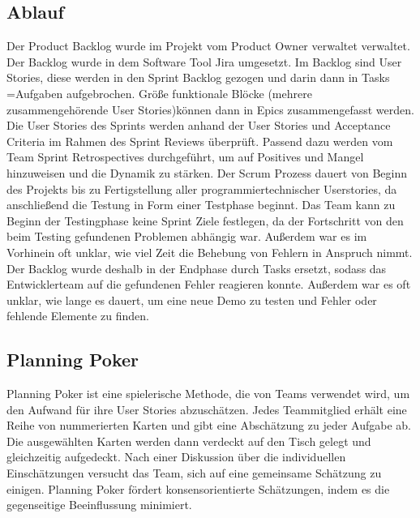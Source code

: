 \subsection{Ablauf}\label{subsec:Ablauf}
Der Product Backlog wurde im Projekt vom Product Owner verwaltet verwaltet.
Der Backlog wurde in dem Software Tool Jira umgesetzt.
Im Backlog sind User Stories, diese werden in den Sprint Backlog gezogen und darin dann in Tasks =Aufgaben aufgebrochen.
Größe funktionale Blöcke (mehrere zusammengehörende User Stories)können dann in Epics zusammengefasst werden.
Die User Stories des Sprints werden anhand der User Stories und Acceptance Criteria im Rahmen des Sprint Reviews überprüft.
Passend dazu werden vom Team Sprint Retrospectives durchgeführt, um auf Positives und Mangel hinzuweisen und die Dynamik zu stärken.
Der Scrum Prozess dauert von Beginn des Projekts bis zu Fertigstellung aller programmiertechnischer Userstories, da anschließend die Testung in Form einer Testphase beginnt.
Das Team kann zu Beginn der Testingphase keine Sprint Ziele festlegen, da der Fortschritt von den beim Testing gefundenen Problemen abhängig war.
Außerdem war es im Vorhinein oft unklar, wie viel Zeit die Behebung von Fehlern in Anspruch nimmt.
Der Backlog wurde deshalb in der Endphase durch Tasks ersetzt, sodass das Entwicklerteam auf die gefundenen Fehler reagieren konnte.
Außerdem war es oft unklar, wie lange es dauert, um eine neue Demo zu testen und Fehler oder fehlende Elemente zu finden.

\subsection{Planning Poker}\label{subsec:Planning-Poker}
Planning Poker ist eine spielerische Methode, die von Teams verwendet wird, um den Aufwand für ihre User Stories abzuschätzen.
Jedes Teammitglied erhält eine Reihe von nummerierten Karten und gibt eine Abschätzung zu jeder Aufgabe ab.
Die ausgewählten Karten werden dann verdeckt auf den Tisch gelegt und gleichzeitig aufgedeckt.
Nach einer Diskussion über die individuellen Einschätzungen versucht das Team, sich auf eine gemeinsame Schätzung zu einigen.
Planning Poker fördert konsensorientierte Schätzungen, indem es die gegenseitige Beeinflussung minimiert. 

\renewcommand{\kapitelautor}{}